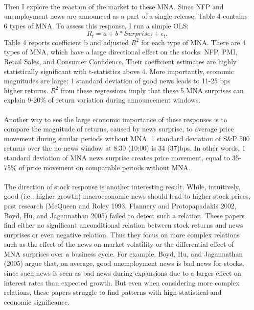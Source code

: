 \documentclass[12pt]{article}
\begin{document}
\paragraph{}
Then I explore the reaction of the market to these MNA. Since NFP and unemployment news are announced as a part of a single release, Table 4 contains 6 types of MNA. To assess this response, I run a simple OLS:
\begin{equation}
    R_t = a + b*Surprise_t + \epsilon_t.
\end{equation}
Table 4 reports coefficient b and adjusted $R^2$ for each type of MNA. There are 4 types of MNA, which have a large directional effect on the stocks: NFP, PMI, Retail Sales, and Consumer Confidence. Their coefficient estimates are highly statistically significant with t-statistics above 4. More importantly, economic magnitudes are large: 1 standard deviation of good news leads to 11-25 bps higher returns. $R^2$ from these regressions imply that these 5 MNA surprises can explain 9-20\% of return variation during announcement windows.
\paragraph{}
Another way to see the large economic importance of these responses is to compare the magnitude of returns, caused by news surprise, to average price movement during similar periods without MNA. 1 standard deviation of S\&P 500 returns over the no-news window at 8:30 (10:00) is 34 (37)bps. In other words, 1 standard deviation of MNA news surprise creates price movement, equal to 35-75\% of price movement on comparable periods without MNA. 
\paragraph{}
The direction of stock response is another interesting result. While, intuitively, good (i.e., higher growth) macroeconomic news should lead to higher stock prices, past research (McQueen and Roley 1993, Flannery and Protopapadakis 2002, Boyd, Hu, and Jagannathan 2005) failed to detect such a relation. These papers find either no significant unconditional relation between stock returns and news surprises or even negative relation. Thus they focus on more complex relations such as the effect of the news on market volatility or the differential effect of MNA surprises over a business cycle. For example, Boyd, Hu, and Jagannathan (2005) argue that, on average, good unemployment news is bad news for stocks, since such news is seen as bad news during expansions due to a larger effect on interest rates than expected growth. But even when considering more complex relations, these papers struggle to find patterns with high statistical and economic significance.
\end{document}
